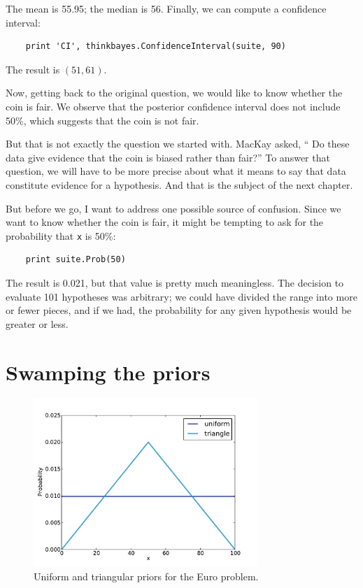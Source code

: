 \documentclass[12pt]{book}
\begin{document}
The mean is 55.95; the median is 56.  Finally, we can compute a
confidence interval: 

\begin{verbatim}
    print 'CI', thinkbayes.ConfidenceInterval(suite, 90)
\end{verbatim}

The result is $(51, 61)$.

Now, getting back to the original question,
we would like to know whether the coin is fair.  We observe
that the posterior confidence interval does not include 50\%,
which suggests that the coin is not fair.

But that is not exactly the question we started with.  MacKay asked,
`` Do these data give evidence that the coin is biased rather than
fair?''  To answer that question, we will have to be more precise
about what it means to say that data constitute evidence for
a hypothesis.  And that is the subject of the next chapter.

But before we go, I want to address one possible source of confusion.
Since we want to know whether the coin is fair, it might be tempting
to ask for the probability that {\tt x} is 50\%:

\begin{verbatim}
    print suite.Prob(50)
\end{verbatim}

The result is 0.021, but that value is pretty much meaningless.  The
decision to evaluate 101 hypotheses was arbitrary; we could have
divided the range into more or fewer pieces, and if we had, the
probability for any given hypothesis would be greater or less.


\section{Swamping the priors}

\begin{figure}
\centerline{\includegraphics[height=2.5in]{figs/euro2.pdf}}
\caption{Uniform and triangular priors for the
Euro problem.}
\label{fig.euro2}
\end{figure}
\end{document}
